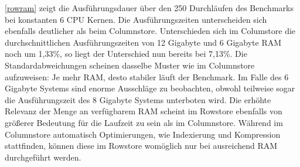 \autoref{rowram} zeigt die Ausführungsdauer über den 250 Durchläufen des Benchmarks bei konstanten 6 CPU Kernen. Die Ausführungszeiten unterscheiden sich ebenfalls deutlicher als beim Columnstore. Unterschieden sich im Columstore die durchschnittlichen Ausführungszeiten von 12 Gigabyte und 6 Gigabyte RAM noch um 1,33\%, so liegt der Unterschied nun bereits bei 7,13\%. Die Standardabweichungen scheinen dasselbe Muster wie im Columnstore aufzuweisen: Je mehr RAM, desto stabiler läuft der Benchmark. Im Falle des 6 Gigabyte Systems sind enorme Ausschläge zu beobachten, obwohl teilweise sogar die Ausführungszeit des 8 Gigabyte Systems unterboten wird. 
Die erhöhte Relevanz der Menge an verfügbarem RAM scheint im Rowstore ebenfalls von größerer Bedeutung für die Laufzeit zu sein als im Columnstore. Während im Columnstore automatisch Optimierungen, wie Indexierung und Kompression stattfinden, können diese im Rowstore womöglich nur bei ausreichend RAM durchgeführt werden. 


